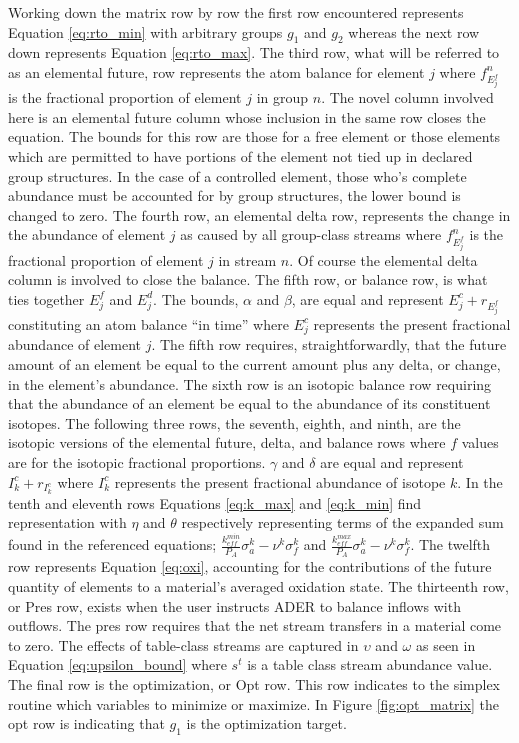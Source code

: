 Working down the matrix row by row the first row encountered represents 
Equation \ref{eq:rto_min} with arbitrary groups $g_{1}$ and $g_{2}$ whereas 
the next row 
down represents Equation \ref{eq:rto_max}. The third row, what will be referred
to as an elemental future, row represents the atom balance for element $j$ where
$f^{n}_{E_{j}^{f}}$ is the fractional proportion of element $j$ in group $n$.
The novel column involved here is an elemental future column whose inclusion
in the same row closes the equation.  
The bounds for this row are those for a
free element or those elements which are permitted to have portions
of the element not tied up in declared group structures. In the case of a
controlled element, those who's complete abundance must be accounted for by
group structures, the lower bound is changed to zero. 
The fourth row, an elemental
delta row, represents the change in the abundance of element $j$
as caused by all group-class streams where
$f^{n}_{E_{j}^{f}}$ is the fractional proportion of element $j$ in stream $n$. 
Of course the elemental delta column 
is involved to close the balance. The fifth row, or balance row, is what ties
together $E_{j}^{f}$ and $E_{j}^{d}$. The bounds, $\alpha$ and $\beta$,
are equal and represent $E_{j}^{c} + r_{E_{j}^{f}}$ constituting an atom
balance ``in time” where $E_{j}^{c}$ represents the present fractional
abundance of element $j$. The fifth row requires, straightforwardly, that the
future amount of an element be equal to the current amount plus any delta,
or change, in the element's abundance. The sixth row is an isotopic balance row
requiring that the abundance of an element be equal to the abundance of its
constituent isotopes. 
The following three rows, the seventh, eighth, and ninth,
are the isotopic versions of the elemental future, delta, and balance rows 
where $f$ values
are for the isotopic fractional proportions.
$\gamma$ and $\delta$ are
equal and represent $I_{k}^{c} + r_{I_{k}^{c}}$ where $I_{k}^{c}$ represents
the present fractional abundance of isotope $k$. In the tenth and eleventh rows
Equations \ref{eq:k_max} and \ref{eq:k_min} find representation with $\eta$
and $\theta$ respectively representing terms of the expanded sum found in the
referenced equations; $\frac{k_{eff}^{min}}{P_{A}} \sigma_{a}^{k} - \nu^{k}
\sigma_{f}^{k}$ and
$\frac{k_{eff}^{max}}{P_{A}} \sigma_{a}^{k} - \nu^{k}
\sigma_{f}^{k}$. 
The twelfth row represents Equation \ref{eq:oxi}, accounting for the
contributions of the future quantity of elements to a material's averaged
oxidation state.
The thirteenth row, or Pres row, exists
when the user instructs ADER to balance inflows with outflows. The
pres row requires that the net stream transfers in a material come to zero. The
effects of table-class streams are captured in $\upsilon$ and $\omega$ as seen
in Equation \ref{eq:upsilon_bound} where $s^{t}$ is a table class stream 
abundance value. The final row is the optimization, or Opt row. This row
indicates to the simplex routine which variables to minimize or maximize. In
Figure \ref{fig:opt_matrix} the opt row is indicating that $g_{1}$ is the
optimization target.

